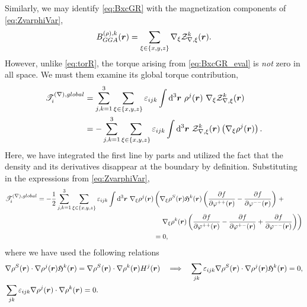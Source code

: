 Similarly, we may identify \cref{eq:BxcGR} with the magnetization components of \cref{eq:ZvarphiVar},
\begin{equation}
B^{(\rho),k}_{GGA}(\boldsymbol{r}) = \sum_{\xi \in \{x,y,z\}} \nabla_\xi \mathcal{Z}^k_{\nabla,\xi}(\boldsymbol{r}) \label{eq:BxcGR_eval} .
\end{equation}
However, unlike  \cref{eq:torR}, the torque arising from \cref{eq:BxcGR_eval} is \emph{not} zero in all space. We must them examine its global torque contribution,
\begin{align}
  \mathscr{T}_i^{(\nabla), global} 
    &= \sum_{j,k=1}^3 \sum_{\xi \in \{x,y,z\}} \varepsilon_{ijk} \int\mathrm{d}^3\boldsymbol{r}\text{   } \rho^j(\boldsymbol{r}) \text{ }\nabla_\xi \mathcal{Z}^k_{\nabla,\xi}(\boldsymbol{r}) \nonumber \\
    &= -\sum_{j,k=1}^3 \sum_{\xi \in \{x,y,z\}} \varepsilon_{ijk} \int\mathrm{d}^3\boldsymbol{r}\text{   } \mathcal{Z}^k_{\nabla,\xi}(\boldsymbol{r}) \left(\nabla_\xi \rho^j(\boldsymbol{r})\right) .
\end{align}
Here, we have integrated the first line by parts and utilized the fact that the density and its derivatives disappear at the boundary by definition.
Substituting in the expressions from \cref{eq:ZvarphiVar},
\begin{align}
  \mathscr{T}_i^{(\nabla), global} 
    = -\frac{1}{2}\sum_{j,k=1}^3 \sum_{\xi \in \{x,y,z\}} \varepsilon_{ijk} \int\mathrm{d}^3\boldsymbol{r}\text{   } 
    \nabla_\xi \rho^j(\boldsymbol{r})
    &\left(
      \nabla_\xi\rho^S(\boldsymbol{r}) \mathfrak H^k(\boldsymbol{r})  \left( \dfrac{\partial f}{\partial \varphi^{++}(\boldsymbol{r})} - \dfrac{\partial f}{\partial \varphi^{--}(\boldsymbol{r})} \right) 
       \right. +\nonumber\\ & \quad \left. \nabla_\xi\rho^k(\boldsymbol{r})
      \left(\dfrac{\partial f}{\partial \varphi^{++}(\boldsymbol{r})} - \dfrac{\partial f}{\partial \varphi^{+-}(\boldsymbol{r})} + \dfrac{\partial f}{\partial \varphi^{--}(\boldsymbol{r})} \right)
    \right) \nonumber \\
    &= 0,
\end{align}
where we have used the following relations
\begin{align}
&\nabla \rho^S(\boldsymbol{r}) \cdot \nabla \rho^j(\boldsymbol{r}) \mathfrak H^k(\boldsymbol{r}) = \nabla \rho^S(\boldsymbol{r}) \cdot \nabla \rho^k (\boldsymbol{r})H^j(\boldsymbol{r})  \quad \Longrightarrow \quad
  \sum_{jk} \varepsilon_{ijk} \nabla \rho^S(\boldsymbol{r}) \cdot \nabla \rho^j(\boldsymbol{r}) \mathfrak H^k(\boldsymbol{r}) = 0, \\
& \sum_{jk}\varepsilon_{ijk} \nabla \rho^j(\boldsymbol{r}) \cdot \nabla \rho^k(\boldsymbol{r}) = 0.
\end{align}
 
